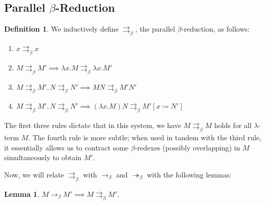 \documentclass[a4paper,11pt]{article}
\theoremstyle{definition}
\newtheorem{definition}{Definition}[section]
\theoremstyle{example}
\theoremstyle{lemma}
\newtheorem{lemma}{Lemma}
\newcommand{\lamterm}[2]{\lambda #1. #2}
\newcommand{\subs}[3]{#1[#2\coloneqq#3]}
\newcommand{\ssbr}{\rightarrow_{\beta}}
\newcommand{\msbr}{\twoheadrightarrow_{\beta}}
\newcommand{\pbr}{\rightrightarrows_{\beta}}
\begin{document}
\subsection{Parallel $\beta$-Reduction}
\begin{definition}
We inductively define $\pbr$, the parallel $\beta$-reduction, as follows:
\begin{enumerate}[topsep=2pt,itemsep=-0.5ex,partopsep=1ex,parsep=1ex]
    \item $x \pbr x$
    \item $M \pbr M' \implies \lamterm{x}{M} \pbr \lamterm{x}{M'}$
    \item $M \pbr M', N \pbr N' \implies MN \pbr M'N'$
    \item $M \pbr M', N \pbr N' \implies (\lamterm{x}{M})N \pbr \subs{M'}{x}{N'}$
\end{enumerate}
The first three rules dictate that in this system, we have $M \pbr M$ holds for all $\lambda$-term $M$. The fourth rule is more subtle; when used in tandem with the third rule, it essentially allows us to contract some $\beta$-redexes (possibly overlapping) in $M$ simultaneously to obtain $M'$.
\end{definition}
Now, we will relate $\pbr$ with $\ssbr$ and $\msbr$ with the following lemmas:
\begin{lemma}
$M \ssbr M' \implies M \pbr M'$.
\end{lemma}
\end{document}
